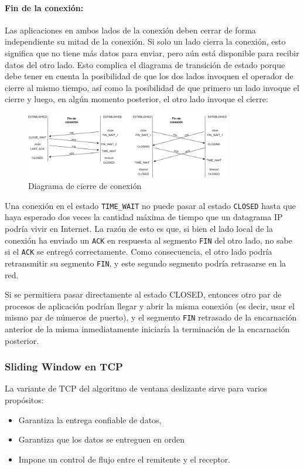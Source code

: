 \paragraph{Fin de la conexión:} 
Las aplicaciones en ambos lados de la conexión deben cerrar de forma independiente su mitad de la conexión. Si solo un lado cierra la conexión, esto significa que no tiene más datos para enviar, pero aún está disponible para recibir datos del otro lado. Esto complica el diagrama de transición de estado porque debe tener en cuenta la posibilidad de que los dos lados invoquen el operador de cierre al mismo tiempo, así como la posibilidad de que primero un lado invoque el cierre y luego, en algún momento posterior, el otro lado invoque el cierre:

\begin{figure}[H]
	\centering
	\includegraphics[width=0.8\textwidth
]{images/tcp-closing-conection.png}
	\caption[Diagrama de cierre de conexión]{Diagrama de cierre de conexión}
	\label{fig:tcp-closign-connection}
\end{figure}

Una conexión en el estado \texttt{TIME\_WAIT} no puede pasar al estado \texttt{CLOSED} hasta que haya esperado dos veces la cantidad máxima de tiempo que un datagrama IP podría vivir en Internet. La razón de esto es que, si bien el lado local de la conexión ha enviado un \texttt{ACK} en respuesta al segmento \texttt{FIN} del otro lado, no sabe si el \texttt{ACK} se entregó correctamente. Como consecuencia, el otro lado podría retransmitir su segmento \texttt{FIN}, y este segundo segmento podría retrasarse en la red. 

Si se permitiera pasar directamente al estado CLOSED, entonces otro par de procesos de aplicación podrían llegar y abrir la misma conexión (es decir, usar el mismo par de números de puerto), y el segmento \texttt{FIN} retrasado de la encarnación anterior de la misma inmediatamente iniciaría la terminación de la encarnación posterior.

\subsubsection*{Sliding Window en TCP}
La variante de TCP del algoritmo de ventana deslizante sirve para varios propósitos:
\begin{itemize}
  \item Garantiza la entrega confiable de datos,
  \item Garantiza que los datos se entreguen en orden
  \item Impone un control de flujo entre el remitente y el receptor.
\end{itemize} 


